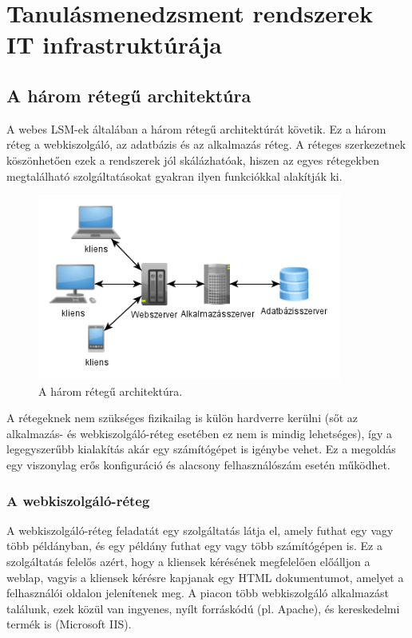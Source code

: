 \chapter{Tanulásmenedzsment rendszerek IT infrastruktúrája}
\section{A három rétegű architektúra}
A webes LSM-ek általában a három rétegű architektúrát követik. Ez a három réteg a webkiszolgáló, az adatbázis és az alkalmazás réteg. A réteges szerkezetnek köszönhetően ezek a rendszerek jól skálázhatóak, hiszen az egyes rétegekben megtalálható szolgáltatásokat gyakran ilyen funkciókkal alakítják ki.

\begin{figure}[!ht]
\centering
\includegraphics[width=100mm, keepaspectratio]{figures/3tier_simple_001.png}
\caption{A három rétegű architektúra.}
\label{fig:3tier_simple_001}
\end{figure}
A rétegeknek nem szükséges fizikailag is külön hardverre kerülni (sőt az alkalmazás- és webkiszolgáló-réteg esetében ez  nem is mindig lehetséges), így a legegyszerűbb kialakítás akár egy számítógépet is igénybe vehet. Ez a megoldás egy viszonylag erős konfiguráció és alacsony felhasználószám esetén működhet.
\subsection{A webkiszolgáló-réteg}
A webkiszolgáló-réteg feladatát egy szolgáltatás látja el, amely futhat egy vagy több példányban, és egy példány futhat egy vagy több számítógépen is. Ez a szolgáltatás felelős azért, hogy a kliensek kérésének megfelelően előálljon a weblap, vagyis a kliensek kérésre kapjanak egy HTML dokumentumot, amelyet a felhasználói oldalon jelenítenek meg.
A piacon több webkiszolgáló alkalmazást találunk, ezek közül van ingyenes, nyílt forráskódú (pl. Apache), és kereskedelmi termék is (Microsoft IIS).

